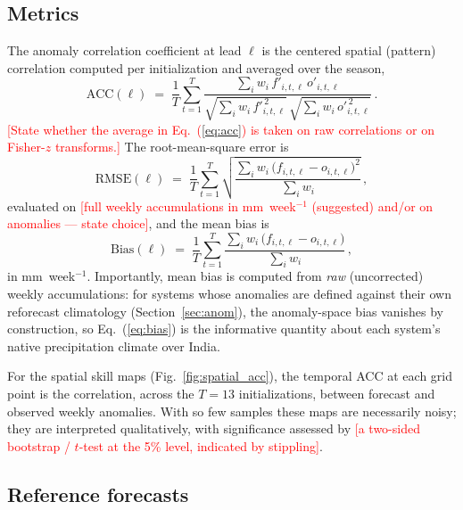 \documentclass[11pt]{article}
\newcommand{\ph}[1]{\textcolor{red}{[#1]}}
\begin{document}
\subsection{Metrics}\label{sec:metrics}

The anomaly correlation coefficient at lead $\ell$ is the centered
spatial (pattern) correlation computed per initialization and averaged
over the season,
\begin{equation}
  \mathrm{ACC}(\ell) \;=\; \frac{1}{T}\sum_{t=1}^{T}
  \frac{\sum_i w_i\, f'_{i,t,\ell}\, o'_{i,t,\ell}}
       {\sqrt{\sum_i w_i\, f'^{\,2}_{i,t,\ell}}\,
        \sqrt{\sum_i w_i\, o'^{\,2}_{i,t,\ell}}}\,.
  \label{eq:acc}
\end{equation}
\ph{State whether the average in Eq.~(\ref{eq:acc}) is taken on raw
correlations or on Fisher-$z$ transforms.} The root-mean-square error
is
\begin{equation}
  \mathrm{RMSE}(\ell) \;=\; \frac{1}{T}\sum_{t=1}^{T}
  \sqrt{\frac{\sum_i w_i\,\bigl(f_{i,t,\ell}-o_{i,t,\ell}\bigr)^{2}}
             {\sum_i w_i}}\,,
  \label{eq:rmse}
\end{equation}
evaluated on \ph{full weekly accumulations in mm~week$^{-1}$ (suggested)
and/or on anomalies --- state choice}, and the mean bias is
\begin{equation}
  \mathrm{Bias}(\ell) \;=\; \frac{1}{T}\sum_{t=1}^{T}
  \frac{\sum_i w_i\,\bigl(f_{i,t,\ell}-o_{i,t,\ell}\bigr)}
       {\sum_i w_i}\,,
  \label{eq:bias}
\end{equation}
in mm~week$^{-1}$. Importantly, mean bias is computed from
\emph{raw} (uncorrected) weekly accumulations: for systems whose
anomalies are defined against their own reforecast climatology
(Section~\ref{sec:anom}), the anomaly-space bias vanishes by
construction, so Eq.~(\ref{eq:bias}) is the informative quantity about
each system's native precipitation climate over India.

For the spatial skill maps (Fig.~\ref{fig:spatial_acc}), the temporal
ACC at each grid point is the correlation, across the $T=13$
initializations, between forecast and observed weekly anomalies. With
so few samples these maps are necessarily noisy; they are interpreted
qualitatively, with significance assessed by \ph{a two-sided
bootstrap / $t$-test at the 5\% level, indicated by stippling}.

\subsection{Reference forecasts}\label{sec:baselines}
\end{document}
